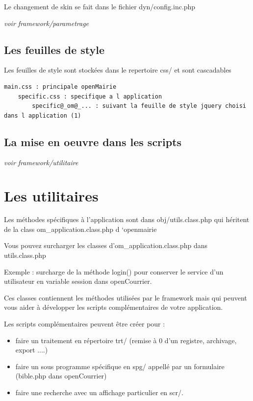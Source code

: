 \documentclass[letterpaper,10pt,french]{manual}
\begin{document}
Le changement de skin se fait dans le fichier dyn/config.inc.php

\emph{voir framework/parametrage}


\subsection{Les feuilles de style}

Les feuilles de style sont stockées dans le repertoire css/ et sont cascadables

\begin{Verbatim}[commandchars=@\[\]]
main.css : principale openMairie
    specific.css : specifique a l application
        specific@_om@_... : suivant la feuille de style jquery choisi dans l application (1)
\end{Verbatim}


\subsection{La mise en oeuvre dans les scripts}

\emph{voir framework/utilitaire}

\resetcurrentobjects
\hypertarget{--doc-framework/utilitaire}{}

\hypertarget{utilitaire}{}\section{Les utilitaires}

Les méthodes spécifiques à l'application sont dans obj/utils.class.php
qui héritent de la class om\_application.class.php d `openmairie

Vous pouvez surcharger les classes d'om\_application.class.php dans utils.class.php

Exemple : surcharge de la méthode login() pour conserver le service d'un utilisateur
en variable session dans openCourrier.

Ces classes contiennent les méthodes utilisées par le framework mais
qui peuvent vous aider à développer les scripts complémentaires de votre application.

Les scripts complémentaires peuvent être créer pour :
\begin{itemize}
\item {} 
faire un traitement en répertoire trt/ (remise à 0 d'un registre, archivage, export ....)

\item {} 
faire un sous programme spécifique en spg/ appellé par un formulaire (bible.php dans openCourrier)

\item {} 
faire une recherche avec un affichage particulier en scr/.

\end{itemize}
\end{document}
